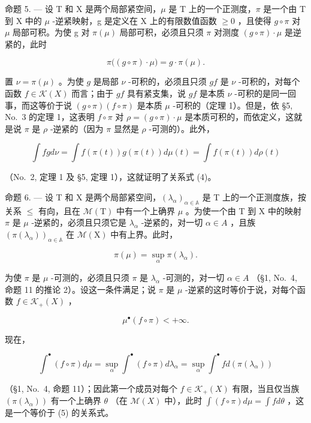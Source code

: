命题 5. --- 设 T 和 X 是两个局部紧空间，\(\mu\) 是 T 上的一个正测度，\(\pi\) 是一个由 T 到 X 中的 \(\mu\) -逆紧映射，g 是定义在 X 上的有限数值函数 \(\geqslant 0\) ，且使得 \(g \circ \pi\) 对 \(\mu\) 局部可积。为使 g 对 \(\pi(\mu)\) 局部可积，必须且只须 \(\pi\) 对测度 \((g \circ \pi) \cdot \mu\) 是逆紧的，此时

\[
\pi \big ((g \circ \pi) \cdot \mu \big) = g \cdot \pi (\mu).\tag{4}
\]

置 \(\nu = \pi(\mu)\) 。为使 \(g\) 是局部 \(\nu\) -可积的，必须且只须 \(gf\) 是 \(\nu\) -可积的，对每个函数 \(f \in \mathcal{K}(X)\) 而言；由于 \(gf\) 具有紧支集，说 \(gf\) 是本质 \(\nu\) -可积的是同一回事，而这等价于说 \((g \circ \pi)(f \circ \pi)\) 是本质 \(\mu\) -可积的（定理 1）。但是，依 §5, No.~3 的定理 1，这表明 \(f \circ \pi\) 对 \(\rho = (g \circ \pi) \cdot \mu\) 是本质可积的，而依定义，这就是说 \(\pi\) 是 \(\rho\) -逆紧的（因为 \(\pi\) 显然是 \(\rho\) -可测的）。此外，

\[
\int f g d \nu = \int f (\pi (t)) g (\pi (t)) d \mu (t) = \int f (\pi (t)) d \rho (t)
\]

（No.~2, 定理 1 及 §5, 定理 1），这就证明了关系式 (4)。

命题 6. --- 设 T 和 X 是两个局部紧空间，\((\lambda_{\alpha})_{\alpha\in\mathbb{A}}\) 是 T 上的一个正测度族，按关系 \(\leqslant\) 有向，且在 \(\mathcal{M}(\mathrm{T})\) 中有一个上确界 \(\mu\) 。为使一个由 T 到 X 中的映射 \(\pi\) 是 \(\mu\) -逆紧的，必须且只须它是 \(\lambda_{\alpha}\) -逆紧的，对一切 \(\alpha\in A\) ，且族 \(\left(\pi(\lambda_{\alpha})\right)_{\alpha\in\mathbb{A}}\) 在 \(\mathcal{M}(\mathrm{X})\) 中有上界。此时，

\[
\pi (\mu) = \sup _ {\alpha} \pi (\lambda_ {\alpha}).\tag{5}
\]

为使 \(\pi\) 是 \(\mu\) -可测的，必须且只须 \(\pi\) 是 \(\lambda_{\alpha}\) -可测的，对一切 \(\alpha \in A\) （§1, No.~4, 命题 11 的推论 2）。设这一条件满足；说 \(\pi\) 是 \(\mu\) -逆紧的这时等价于说，对每个函数 \(f \in \mathcal{K}_{+}(X)\) ，

\[
\mu^ {\bullet} (f \circ \pi) <   + \infty .
\]

现在，

\[
\int^ {\bullet} (f \circ \pi) d \mu = \sup _ {\alpha} \int^ {\bullet} (f \circ \pi) d \lambda_ {\alpha} = \sup _ {\alpha} \int^ {\bullet} f d (\pi (\lambda_ {\alpha}))
\]

（§1, No.~4, 命题 11）；因此第一个成员对每个 \(f \in \mathcal{K}_{+}(X)\) 有限，当且仅当族 \((\pi(\lambda_{\alpha}))\) 有一个上确界 \(\theta\) （在 \(\mathcal{M}(X)\) 中），此时 \(\int(f \circ \pi) d\mu = \int f d\theta\) ，这是一个等价于 (5) 的关系式。

